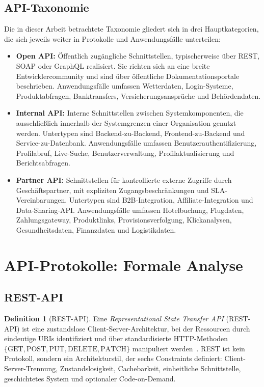 ﻿\documentclass[a4paper,12pt]{article}
\theoremstyle{definition}
\newtheorem{definition}{Definition}
\begin{document}
\subsection{API-Taxonomie}

Die in dieser Arbeit betrachtete Taxonomie gliedert sich in drei Hauptkategorien,
die sich jeweils weiter in Protokolle und Anwendungsfälle unterteilen:

\begin{itemize}
  \item \textbf{Open API:} Öffentlich zugängliche Schnittstellen, typischerweise
    über REST, SOAP oder GraphQL realisiert. Sie richten sich an eine breite
    Entwicklercommunity und sind über öffentliche Dokumentationsportale beschrieben.
    Anwendungsfälle umfassen Wetterdaten, Login-Systeme, Produktabfragen,
    Banktransfers, Versicherungsansprüche und Behördendaten.
  \item \textbf{Internal API:} Interne Schnittstellen zwischen Systemkomponenten,
    die ausschließlich innerhalb der Systemgrenzen einer Organisation genutzt werden.
    Untertypen sind Backend-zu-Backend, Frontend-zu-Backend und Service-zu-Datenbank.
    Anwendungsfälle umfassen Benutzerauthentifizierung, Profilabruf, Live-Suche,
    Benutzerverwaltung, Profilaktualisierung und Berichtsabfragen.
  \item \textbf{Partner API:} Schnittstellen für kontrollierte externe Zugriffe durch
    Geschäftspartner, mit expliziten Zugangsbeschränkungen und SLA-Vereinbarungen.
    Untertypen sind B2B-Integration, Affiliate-Integration und Data-Sharing-API.
    Anwendungsfälle umfassen Hotelbuchung, Flugdaten, Zahlungsgateway, Produktlinks,
    Provisionsverfolgung, Klickanalysen, Gesundheitsdaten, Finanzdaten und
    Logistikdaten.
\end{itemize}

\section{API-Protokolle: Formale Analyse}

\subsection{REST-API}

\begin{definition}[REST-API]
  Eine \emph{Representational State Transfer API} (REST-API) ist eine
  zustandslose Client-Server-Architektur, bei der Ressourcen durch eindeutige
  URIs identifiziert und über standardisierte HTTP-Methoden
  $\{\mathrm{GET}, \mathrm{POST}, \mathrm{PUT}, \mathrm{DELETE}, \mathrm{PATCH}\}$
  manipuliert werden~\cite{fielding2000}. REST ist kein Protokoll, sondern ein
  Architekturstil, der sechs Constraints definiert: Client-Server-Trennung,
  Zustandslosigkeit, Cachebarkeit, einheitliche Schnittstelle, geschichtetes System
  und optionaler Code-on-Demand.
\end{definition}
\end{document}
